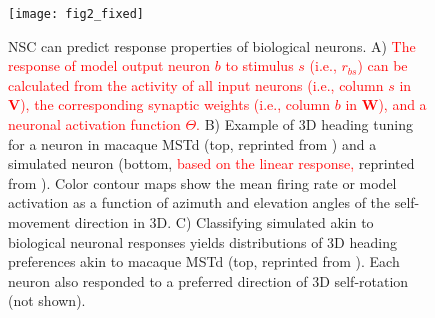 \begin{figure}[h]
	\centering
	\texttt{[image: fig2\_fixed]}
    \caption{\ac{NSC} can predict response properties of biological neurons.
    A) \textcolor{red}{The response of model output neuron $b$
       to stimulus $s$ (i.e., $r_{bs}$)
       can be calculated from the activity of all
       input neurons (i.e., column $s$ in \textbf{V}), the
       corresponding synaptic weights (i.e., column $b$ in
       $\mathbf{W}$), and a neuronal activation function $\Theta$.}
    B) Example of 3D heading tuning for a neuron in macaque
       \ac{MSTd} (top, reprinted from \cite{Takahashi2007}) and a
       simulated neuron (bottom,
       \textcolor{red}{based on the linear response,}
       reprinted from \cite{Beyeler2016}).
       Color contour maps show the mean firing rate or model
       activation as a function of azimuth and elevation angles
       of the self-movement direction in 3D.
    C) Classifying simulated akin to biological neuronal responses
       yields distributions of 3D heading preferences akin to 
       macaque \ac{MSTd} (top, reprinted from \cite{Beyeler2016}).
       Each neuron also responded to a preferred direction of 3D
       self-rotation (not shown).}
	\label{fig:NMF|neuronalresponse}
\end{figure}



